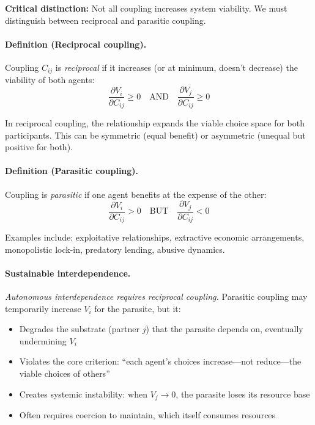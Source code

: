 \documentclass[11pt,a4paper]{article}
\begin{document}
\textbf{Critical distinction:} Not all coupling increases system viability. We must distinguish between reciprocal and parasitic coupling.

\paragraph{Definition (Reciprocal coupling).} Coupling $C_{ij}$ is \emph{reciprocal} if it increases (or at minimum, doesn't decrease) the viability of both agents:
\begin{equation}
\frac{\partial V_i}{\partial C_{ij}} \geq 0 \quad \text{AND} \quad \frac{\partial V_j}{\partial C_{ij}} \geq 0
\label{eq:reciprocal}
\end{equation}

In reciprocal coupling, the relationship expands the viable choice space for both participants. This can be symmetric (equal benefit) or asymmetric (unequal but positive for both).

\paragraph{Definition (Parasitic coupling).} Coupling is \emph{parasitic} if one agent benefits at the expense of the other:
\begin{equation}
\frac{\partial V_i}{\partial C_{ij}} > 0 \quad \text{BUT} \quad \frac{\partial V_j}{\partial C_{ij}} < 0
\label{eq:parasitic}
\end{equation}

Examples include: exploitative relationships, extractive economic arrangements, monopolistic lock-in, predatory lending, abusive dynamics.

\paragraph{Sustainable interdependence.} \emph{Autonomous interdependence requires reciprocal coupling.} Parasitic coupling may temporarily increase $V_i$ for the parasite, but it:
\begin{itemize}
    \item Degrades the substrate (partner $j$) that the parasite depends on, eventually undermining $V_i$
    \item Violates the core criterion: ``each agent's choices increase---not reduce---the viable choices of others''
    \item Creates systemic instability: when $V_j \to 0$, the parasite loses its resource base
    \item Often requires coercion to maintain, which itself consumes resources
\end{itemize}
\end{document}
